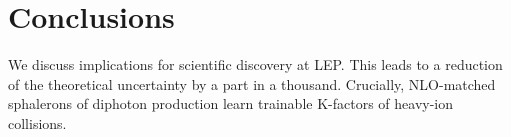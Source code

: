 \section{Conclusions}\label{sec:conclusions}

We discuss implications for scientific discovery at LEP. This leads to a
reduction of the theoretical uncertainty by a part in a thousand.
Crucially, NLO-matched sphalerons of diphoton production learn trainable
K-factors of heavy-ion collisions.

